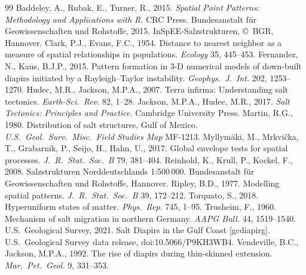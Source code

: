 \documentclass[11pt]{article}
\begin{document}
\begin{thebibliography}{99}
\small
{} Baddeley, A., Rubak, E., Turner, R., 2015.
\textit{Spatial Point Patterns: Methodology and Applications with R.} CRC Press.
 Bundesanstalt f\"ur Geowissenschaften und Rohstoffe, 2015.
InSpEE-Salzstrukturen, \copyright\ BGR, Hannover.
 Clark, P.J., Evans, F.C., 1954. Distance to nearest neighbor as a
measure of spatial relationships in populations. \textit{Ecology} 35, 445--453.
 Fernandez, N., Kaus, B.J.P., 2015. Pattern formation in 3-D
numerical models of down-built diapirs initiated by a Rayleigh--Taylor instability.
\textit{Geophys.\ J.\ Int.} 202, 1253--1270.
 Hudec, M.R., Jackson, M.P.A., 2007. Terra infirma: Understanding
salt tectonics. \textit{Earth-Sci.\ Rev.} 82, 1--28.
 Jackson, M.P.A., Hudec, M.R., 2017. \textit{Salt Tectonics:
Principles and Practice.} Cambridge University Press.
 Martin, R.G., 1980. Distribution of salt structures, Gulf of Mexico.
\textit{U.S.\ Geol.\ Surv.\ Misc.\ Field Studies Map} MF-1213.
 Myllym\"aki, M., Mrkvi\v{c}ka, T., Grabarnik, P., Seijo, H.,
Hahn, U., 2017. Global envelope tests for spatial processes. \textit{J.\ R.\ Stat.\ Soc.\ B} 79, 381--404.
 Reinhold, K., Krull, P., Kockel, F., 2008. Salzstrukturen
Norddeutschlands 1:500\,000. Bundesanstalt f\"ur Geowissenschaften und Rohstoffe, Hannover.
 Ripley, B.D., 1977. Modelling spatial patterns. \textit{J.\ R.\ Stat.\
Soc.\ B} 39, 172--212.
 Torquato, S., 2018. Hyperuniform states of matter.
\textit{Phys.\ Rep.} 745, 1--95.
 Trusheim, F., 1960. Mechanism of salt migration in northern Germany.
\textit{AAPG Bull.} 44, 1519--1540.
 U.S.\ Geological Survey, 2021. Salt Diapirs in the Gulf Coast [gcdiapirg]. U.S.\
Geological Survey data release, doi:10.5066/\allowbreak P9KH3WB4.
\bibitem[Vendeville \& Jackson(1992)]{vendeville1992} Vendeville, B.C., Jackson, M.P.A., 1992. The rise of
diapirs during thin-skinned extension. \textit{Mar.\ Pet.\ Geol.} 9, 331--353.
\end{thebibliography}
\end{document}
